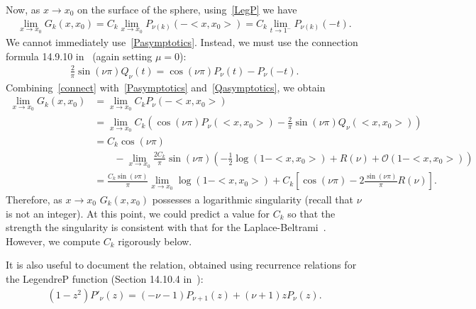 \documentclass[final]{siamltex}
\newcommand{\C}{C_k}
\newcommand{\bigO} {\mathcal{O}}
\begin{document}
Now, as $x\rightarrow x_{0}$ on the surface of the sphere,
using~\eqref{LegP} we have 
\begin{align*}
  \lim_{x\rightarrow x_{0}}G_k(x,x_{0}) =
  \C\lim_{x\rightarrow x_{0}} P_{\nu(k)}\left(-<x,x_{0}>\right) =
  \C\lim_{t\rightarrow 1^-}P_{\nu(k)}\left(-t\right).
\end{align*}
We cannot immediately use~\eqref{Pasymptotics}. Instead, we must use the connection formula 14.9.10 in~\cite{fatAbramowitz} (again setting $\mu=0$):
\begin{align}
  \label{connect}
  \frac{2}{\pi}\sin(\nu \pi)Q_\nu(t)= \cos(\nu\pi)P_\nu(t) - P_\nu(-t).
\end{align}
Combining~\eqref{connect} with~\eqref{Pasymptotics}
and~\eqref{Qasymptotics}, we obtain
\begin{align}
  \lim_{x\rightarrow x_{0}}G_k(x,x_{0}) &= \lim_{x\rightarrow x_{0}}
      \C P_{\nu}(-<x,x_{0}>) \nonumber \\
  &= \lim_{x\rightarrow x_{0} }\C\left(\cos(\nu\pi)
  P_{\nu}(<x,x_{0}>) - 
      \frac{2}{\pi}\sin(\nu \pi)Q_{\nu}(<x,x_0>)\right) \nonumber \\
  &= \C\cos(\nu\pi)  \\
  & \qquad - \lim_{x\rightarrow x_0} \frac{2\C}{\pi}\sin(\nu\pi)\left(-\frac{1}{2}\log(1-<x,x_0>) + R(\nu) +
      \bigO(1-<x,x_0>)\right) \nonumber \\
  &=\frac{\C\sin(\nu\pi)}{\pi}\lim_{x\rightarrow x_0}
      \log(1-<x,x_0>) + \C\left[\cos(\nu\pi)-
      2\frac{\sin(\nu\pi)}{\pi}R(\nu)\right].
  \label{e:logSingularity}
\end{align}
Therefore, as $x\rightarrow x_{0}$ $G_k(x,x_{0})$ possesses a
logarithmic singularity (recall that $\nu$ is not an integer).  At this
point, we could predict a value for $\C$ so that the strength the
singularity is consistent with that for the
Laplace-Beltrami~\cite{gemmrich}.  However, we compute $\C$ rigorously
below.

It is also useful to document the relation, obtained using recurrence
relations for the LegendreP function (Section 14.10.4
in~\cite{fatAbramowitz}):
\begin{align*} 
  (1-z^2) P'_\nu(z) = (-\nu-1) P_{\nu+1}(z) + (\nu+1)z P_\nu(z).
\end{align*}
\end{document}
